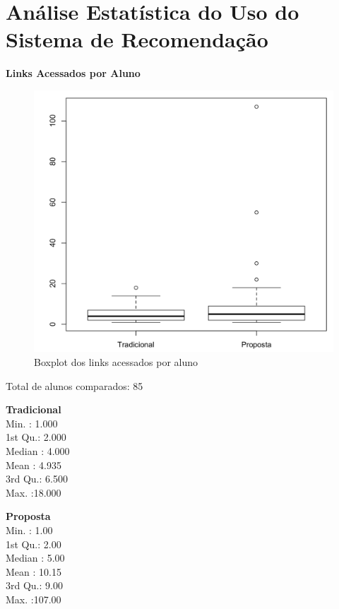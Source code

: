 \chapter{Análise Estatística do Uso do Sistema de Recomendação}\label{ape:analise-estatistica-do-uso}

\textbf{Links Acessados por Aluno}

\begin{figure}[htb]
  \caption{\label{fig:uso-sr-boxplot}Boxplot dos links acessados por aluno}
  \begin{center}
      \includegraphics[scale=0.4]{./Figuras/uso-sr-boxplot.png}
  \end{center}
\end{figure}

Total de alunos comparados: 85

\begin{multicols}{2}

\noindent\textbf{Tradicional}\\
Min.   : 1.000\\
1st Qu.: 2.000\\
Median : 4.000\\
Mean   : 4.935\\
3rd Qu.: 6.500\\
Max.   :18.000\\

\columnbreak

\noindent\textbf{Proposta}\\
 Min.   :  1.00\\
 1st Qu.:  2.00\\
 Median :  5.00\\
 Mean   : 10.15\\
 3rd Qu.:  9.00\\
 Max.   :107.00
\end{multicols}

